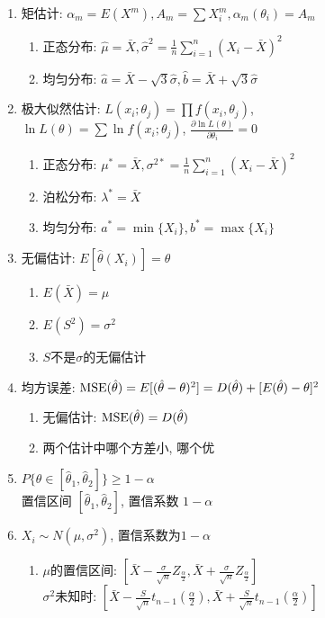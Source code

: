 \begin{enumerate}
\item 矩估计: $\alpha_m=E(X^m), A_m=\sum X_i^m, \alpha_m(\theta_i)=A_m$
\begin{enumerate}
\item 正态分布: $\hat\mu=\bar{X}, \hat\sigma^2=\frac{1}{n}\sum_{i=1}^n(X_i-\bar{X})^2$
\item 均匀分布: $\hat a=\bar{X}-\sqrt{3}\hat\sigma, \hat b=\bar{X}+\sqrt{3}\hat\sigma$
\end{enumerate}
\item 极大似然估计: $L(x_i;\theta_j)=\prod f(x_i,\theta_j)$,\\
$\ln L(\theta)=\sum \ln f(x_i; \theta_j)$,
$\frac{\partial\ln L(\theta)}{\partial\theta_i}=0$
\begin{enumerate}
\item 正态分布: $\mu^*=\bar{X}, \sigma^{2*}=\frac{1}{n}\sum_{i=1}^n(X_i-\bar{X})^2$
\item 泊松分布: $\lambda^*=\bar{X}$
\item 均匀分布: $a^*=\min\{X_i\}, b^*=\max\{X_i\}$
\end{enumerate}
\item 无偏估计: $E[\hat\theta(X_i)]=\theta$
\begin{enumerate}
\item $E(\bar{X})=\mu$
\item $E(S^2)=\sigma^2$
\item $S$不是$\sigma$的无偏估计
\end{enumerate}
\item 均方误差: $\operatorname{MSE}(\hat\theta)=E[(\hat\theta-\theta)^2]=D(\hat\theta)+[E(\hat\theta)-\theta]^2$
\begin{enumerate}
\item 无偏估计: $\operatorname{MSE}(\hat\theta)=D(\hat\theta)$
\item 两个估计中哪个方差小, 哪个优
\end{enumerate}
\item $P\{\theta\in[\hat\theta_1,\hat\theta_2]\}\ge1-\alpha$\\
置信区间 $[\hat\theta_1,\hat\theta_2]$, 置信系数 $1-\alpha$
\item $X_i\sim N(\mu,\sigma^2)$, 置信系数为$1-\alpha$
\begin{enumerate}
\item $\mu$的置信区间: $[\bar{X}-\frac{\sigma}{\sqrt{n}}Z_{\frac{\alpha}{2}},\bar{X}+\frac{\sigma}{\sqrt{n}}Z_{\frac{\alpha}{2}}]$\\
$\sigma^2$未知时: $[\bar{X}-\frac{S}{\sqrt{n}}t_{n-1}(\frac{\alpha}{2}),\bar{X}+\frac{S}{\sqrt{n}}t_{n-1}(\frac{\alpha}{2})]$

\end{enumerate}
\end{enumerate}
